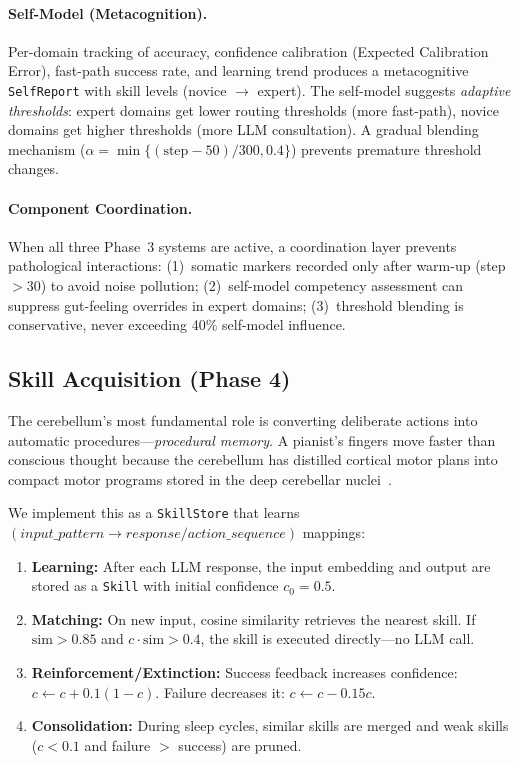 \documentclass[11pt,a4paper]{article}
\begin{document}
\paragraph{Self-Model (Metacognition).}
Per-domain tracking of accuracy, confidence calibration (Expected Calibration Error), fast-path success rate, and learning trend produces a metacognitive \texttt{SelfReport} with skill levels (novice $\to$ expert).
The self-model suggests \emph{adaptive thresholds}: expert domains get lower routing thresholds (more fast-path), novice domains get higher thresholds (more LLM consultation).
A gradual blending mechanism ($\alpha = \min\{(\text{step} - 50)/300, 0.4\}$) prevents premature threshold changes.

\paragraph{Component Coordination.}
When all three Phase~3 systems are active, a coordination layer prevents pathological interactions: (1)~somatic markers recorded only after warm-up (step $> 30$) to avoid noise pollution; (2)~self-model competency assessment can suppress gut-feeling overrides in expert domains; (3)~threshold blending is conservative, never exceeding 40\% self-model influence.

\subsection{Skill Acquisition (Phase 4)}\label{sec:skill_acq}

The cerebellum's most fundamental role is converting deliberate actions into automatic procedures---\emph{procedural memory}.
A pianist's fingers move faster than conscious thought because the cerebellum has distilled cortical motor plans into compact motor programs stored in the deep cerebellar nuclei~\citep{doya2000complementary}.

We implement this as a \texttt{SkillStore} that learns $(input\_pattern \to response/action\_sequence)$ mappings:

\begin{enumerate}[nosep]
\item \textbf{Learning:} After each LLM response, the input embedding and output are stored as a \texttt{Skill} with initial confidence $c_0 = 0.5$.
\item \textbf{Matching:} On new input, cosine similarity retrieves the nearest skill. If $\text{sim} > 0.85$ and $c \cdot \text{sim} > 0.4$, the skill is executed directly---no LLM call.
\item \textbf{Reinforcement/Extinction:} Success feedback increases confidence: $c \leftarrow c + 0.1(1-c)$. Failure decreases it: $c \leftarrow c - 0.15c$.
\item \textbf{Consolidation:} During sleep cycles, similar skills are merged and weak skills ($c < 0.1$ and failure $>$ success) are pruned.
\end{enumerate}
\end{document}
